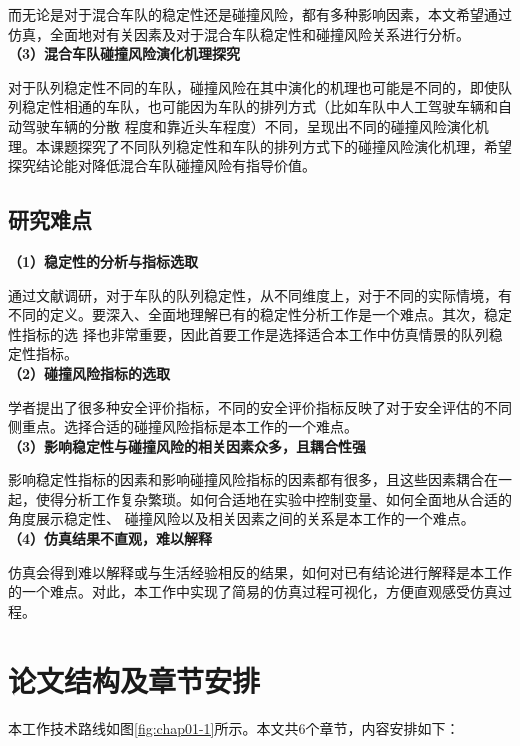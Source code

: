 而无论是对于混合车队的稳定性还是碰撞风险，都有多种影响因素，本文希望通过仿真，全面地对有关因素及对于混合车队稳定性和碰撞风险关系进行分析。\\

\noindent \textbf{（3）混合车队碰撞风险演化机理探究}

对于队列稳定性不同的车队，碰撞风险在其中演化的机理也可能是不同的，即使队列稳定性相通的车队，也可能因为车队的排列方式（比如车队中人工驾驶车辆和自动驾驶车辆的分散
程度和靠近头车程度）不同，呈现出不同的碰撞风险演化机理。本课题探究了不同队列稳定性和车队的排列方式下的碰撞风险演化机理，希望探究结论能对降低混合车队碰撞风险有指导价值。

\subsection{研究难点}

\noindent \textbf{（1）稳定性的分析与指标选取}

通过文献调研，对于车队的队列稳定性，从不同维度上，对于不同的实际情境，有不同的定义。要深入、全面地理解已有的稳定性分析工作是一个难点。其次，稳定性指标的选
择也非常重要，因此首要工作是选择适合本工作中仿真情景的队列稳定性指标。\\

\noindent \textbf{（2）碰撞风险指标的选取}

学者提出了很多种安全评价指标，不同的安全评价指标反映了对于安全评估的不同侧重点。选择合适的碰撞风险指标是本工作的一个难点。 \\

\noindent \textbf{（3）影响稳定性与碰撞风险的相关因素众多，且耦合性强}

影响稳定性指标的因素和影响碰撞风险指标的因素都有很多，且这些因素耦合在一起，使得分析工作复杂繁琐。如何合适地在实验中控制变量、如何全面地从合适的角度展示稳定性、
碰撞风险以及相关因素之间的关系是本工作的一个难点。\\

\noindent \textbf{（4）仿真结果不直观，难以解释}

仿真会得到难以解释或与生活经验相反的结果，如何对已有结论进行解释是本工作的一个难点。对此，本工作中实现了简易的仿真过程可视化，方便直观感受仿真过程。

\section{论文结构及章节安排}

本工作技术路线如图\ref{fig:chap01-1}所示。本文共6个章节，内容安排如下：


